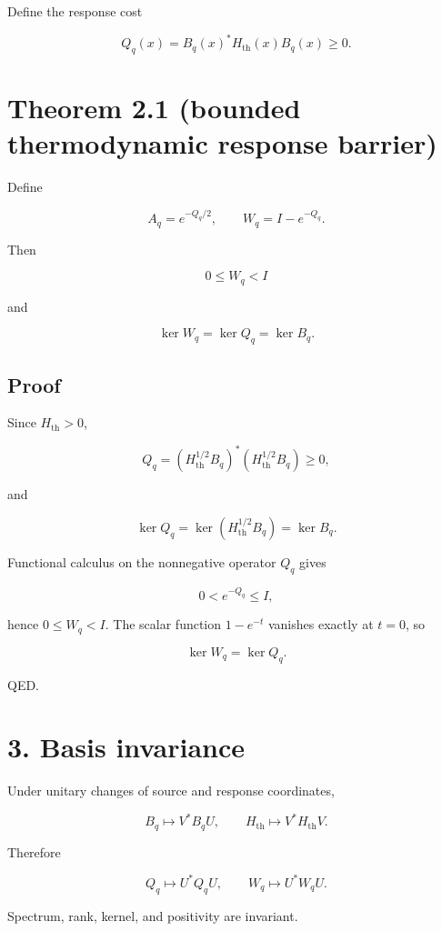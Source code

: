 Define the response cost

\[
\boxed{
Q_q(x)=B_q(x)^*H_{\mathrm{th}}(x)B_q(x)\ge0.
}
\]

\hypertarget{theorem-2.1-bounded-thermodynamic-response-barrier}{%
\section{Theorem 2.1 (bounded thermodynamic response barrier)}\label{theorem-2.1-bounded-thermodynamic-response-barrier}}

Define

\[
A_q=e^{-Q_q/2},
\qquad
\boxed{
W_q=I-e^{-Q_q}.
}
\]

Then

\[
\boxed{0\le W_q<I}
\]

and

\[
\boxed{
\ker W_q=\ker Q_q=\ker B_q.
}
\]

\hypertarget{proof}{%
\subsection{Proof}\label{proof}}

Since \(H_{\mathrm{th}}>0\),

\[
Q_q=(H_{\mathrm{th}}^{1/2}B_q)^*(H_{\mathrm{th}}^{1/2}B_q)\ge0,
\]

and

\[
\ker Q_q=\ker(H_{\mathrm{th}}^{1/2}B_q)=\ker B_q.
\]

Functional calculus on the nonnegative operator \(Q_q\) gives

\[
0<e^{-Q_q}\le I,
\]

hence \(0\le W_q<I\). The scalar function \(1-e^{-t}\) vanishes exactly at \(t=0\), so

\[
\ker W_q=\ker Q_q.
\]

QED.

\hypertarget{basis-invariance}{%
\section{3. Basis invariance}\label{basis-invariance}}

Under unitary changes of source and response coordinates,

\[
B_q\mapsto V^*B_qU,
\qquad
H_{\mathrm{th}}\mapsto V^*H_{\mathrm{th}}V.
\]

Therefore

\[
Q_q\mapsto U^*Q_qU,
\qquad
W_q\mapsto U^*W_qU.
\]

Spectrum, rank, kernel, and positivity are invariant.

